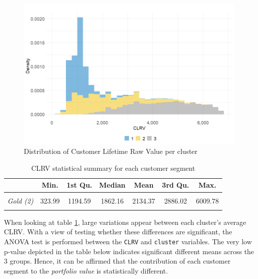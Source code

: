 \documentclass[
]{book}
\begin{document}
\begin{figure}

{\centering \includegraphics[width=12.5in]{./imgs/clrv_density_per_cluster} 

}

\caption{Distribution of Customer Lifetime Raw Value per cluster}\label{fig:clrvDensClust}
\end{figure}

\begin{table}[H]

\caption{\label{tab:custValuesclust}CLRV statistical summary for each customer segment}
\centering
\begin{tabular}[t]{>{}lcccccc}
\toprule
  & Min. & 1st Qu. & Median & Mean & 3rd Qu. & Max.\\
\midrule
\em{\cellcolor{gray!6}{Silver (1)}} & \cellcolor{gray!6}{333.82} & \cellcolor{gray!6}{837.50} & \cellcolor{gray!6}{1094.51} & \cellcolor{gray!6}{1134.40} & \cellcolor{gray!6}{1264.28} & \cellcolor{gray!6}{4679.80}\\
\em{Gold (2)} & 323.99 & 1194.59 & 1862.16 & 2134.37 & 2886.02 & 6009.78\\
\em{\cellcolor{gray!6}{Platinum (3)}} & \cellcolor{gray!6}{1268.74} & \cellcolor{gray!6}{3393.93} & \cellcolor{gray!6}{4489.62} & \cellcolor{gray!6}{4408.44} & \cellcolor{gray!6}{5454.71} & \cellcolor{gray!6}{6815.42}\\
\bottomrule
\end{tabular}
\end{table}

When looking at table \ref{tab:custValuesclust}, large variations appear between each cluster's average CLRV. With a view of testing whether these differences are significant, the ANOVA test is performed between the \texttt{CLRV} and \texttt{cluster} variables. The very low p-value depicted in the table below indicates significant different means across the 3 groups. Hence, it can be affirmed that the contribution of each customer segment to the \emph{portfolio} \emph{value} is statistically different.
\end{document}
